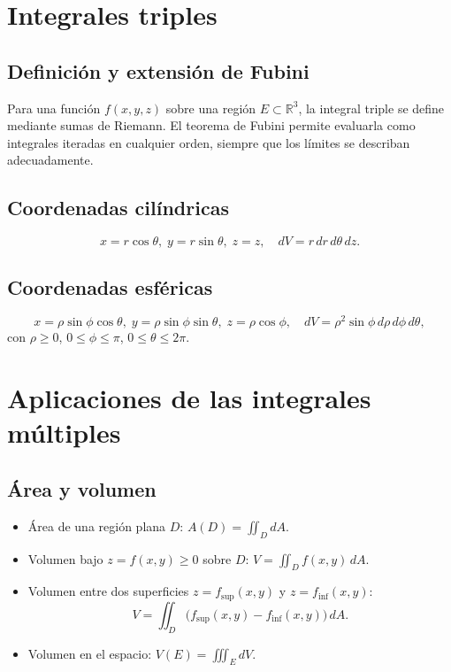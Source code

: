 \documentclass[12pt,spanish]{article}
\newcommand{\RR}{\mathbb{R}}
\begin{document}
\section{Integrales triples}

\subsection{Definición y extensión de Fubini}
Para una función $f(x,y,z)$ sobre una región $E\subset\RR^3$, la integral triple se define mediante sumas de Riemann. El teorema de Fubini permite evaluarla como integrales iteradas en cualquier orden, siempre que los límites se describan adecuadamente.

\subsection{Coordenadas cilíndricas}
\[
x = r\cos\theta,\; y = r\sin\theta,\; z = z,\quad dV = r\,dr\,d\theta\,dz.
\]

\subsection{Coordenadas esféricas}
\[
x = \rho\sin\phi\cos\theta,\; y = \rho\sin\phi\sin\theta,\; z = \rho\cos\phi,\quad dV = \rho^2\sin\phi\,d\rho\,d\phi\,d\theta,
\]
con $\rho\ge0$, $0\le\phi\le\pi$, $0\le\theta\le2\pi$.

\section{Aplicaciones de las integrales múltiples}

\subsection{Área y volumen}
\begin{itemize}
\item Área de una región plana $D$: $\displaystyle A(D)=\iint_D dA$.
\item Volumen bajo $z=f(x,y)\ge0$ sobre $D$: $\displaystyle V=\iint_D f(x,y)\,dA$.
\item Volumen entre dos superficies $z=f_{\text{sup}}(x,y)$ y $z=f_{\text{inf}}(x,y)$:
\[
V=\iint_D \bigl(f_{\text{sup}}(x,y)-f_{\text{inf}}(x,y)\bigr)\,dA.
\]
\item Volumen en el espacio: $\displaystyle V(E)=\iiint_E dV$.
\end{itemize}
\end{document}
